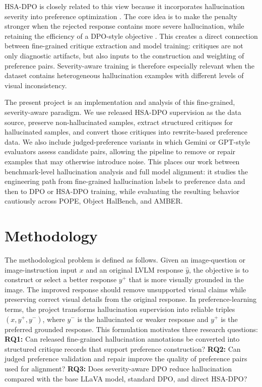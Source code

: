 \documentclass{article}
\begin{document}
HSA-DPO is closely related to this view because it incorporates hallucination severity into preference optimization \citep{xiao2025hsa}. The core idea is to make the penalty stronger when the rejected response contains more severe hallucination, while retaining the efficiency of a DPO-style objective \citep{rafailov2024dpo}. This creates a direct connection between fine-grained critique extraction and model training: critiques are not only diagnostic artifacts, but also inputs to the construction and weighting of preference pairs. Severity-aware training is therefore especially relevant when the dataset contains heterogeneous hallucination examples with different levels of visual inconsistency.

The present project is an implementation and analysis of this fine-grained, severity-aware paradigm. We use released HSA-DPO supervision as the data source, preserve non-hallucinated samples, extract structured critiques for hallucinated samples, and convert those critiques into rewrite-based preference data. We also include judged-preference variants in which Gemini or GPT-style evaluators assess candidate pairs, allowing the pipeline to remove or repair examples that may otherwise introduce noise. This places our work between benchmark-level hallucination analysis and full model alignment: it studies the engineering path from fine-grained hallucination labels to preference data and then to DPO or HSA-DPO training, while evaluating the resulting behavior cautiously across POPE, Object HalBench, and AMBER.

\section{Methodology}

The methodological problem is defined as follows. Given an image-question or image-instruction input $x$ and an original LVLM response $\hat{y}$, the objective is to construct or select a better response $y^+$ that is more visually grounded in the image. The improved response should remove unsupported visual claims while preserving correct visual details from the original response. In preference-learning terms, the project transforms hallucination supervision into reliable triples $(x, y^+, y^-)$, where $y^-$ is the hallucinated or weaker response and $y^+$ is the preferred grounded response. This formulation motivates three research questions: \textbf{RQ1:} Can released fine-grained hallucination annotations be converted into structured critique records that support preference construction? \textbf{RQ2:} Can judged preference validation and repair improve the quality of preference pairs used for alignment? \textbf{RQ3:} Does severity-aware DPO reduce hallucination compared with the base LLaVA model, standard DPO, and direct HSA-DPO?
\end{document}
